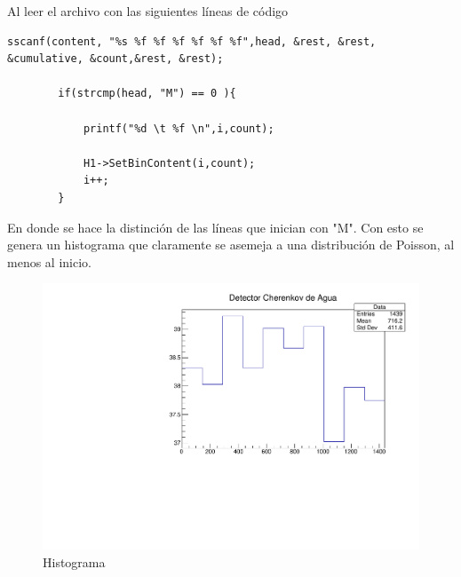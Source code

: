 \vspace{0.5cm}
Al leer el archivo con las siguientes líneas de código
\begin{lstlisting}
sscanf(content, "%s %f %f %f %f %f %f",head, &rest, &rest, &cumulative, &count,&rest, &rest);

        if(strcmp(head, "M") == 0 ){

            printf("%d \t %f \n",i,count);

            H1->SetBinContent(i,count);
            i++;
        }
\end{lstlisting}
En donde se hace la distinción de las líneas que inician con "M". Con esto se genera un histograma que claramente se asemeja a una distribución de Poisson, al menos al inicio.

\begin{figure}[H]
	\centering
	\includegraphics[scale=0.5]{histograma.pdf}
	\caption{Histograma}
	\label{hist}
\end{figure}
